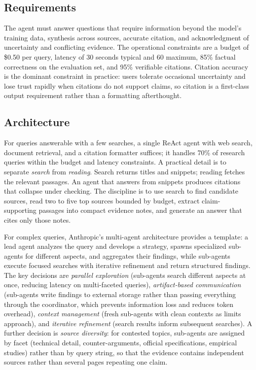 \documentclass[11pt]{book}
\begin{document}
\subsection{Requirements}

The agent must answer questions that require information beyond the model's training data, synthesis across sources, accurate citation, and acknowledgment of uncertainty and conflicting evidence. The operational constraints are a budget of \$0.50 per query, latency of 30 seconds typical and 60 maximum, 85\% factual correctness on the evaluation set, and 95\% verifiable citations. Citation accuracy is the dominant constraint in practice: users tolerate occasional uncertainty and lose trust rapidly when citations do not support claims, so citation is a first-class output requirement rather than a formatting afterthought.

\subsection{Architecture}

For queries answerable with a few searches, a single ReAct agent with web search, document retrieval, and a citation formatter suffices; it handles 70\% of research queries within the budget and latency constraints. A practical detail is to separate \textit{search} from \textit{reading}. Search returns titles and snippets; reading fetches the relevant passages. An agent that answers from snippets produces citations that collapse under checking. The discipline is to use search to find candidate sources, read two to five top sources bounded by budget, extract claim-supporting passages into compact evidence notes, and generate an answer that cites only those notes.

For complex queries, Anthropic's multi-agent architecture \cite{anthropicresearch2025} provides a template: a lead agent analyzes the query and develops a strategy, spawns specialized sub-agents for different aspects, and aggregates their findings, while sub-agents execute focused searches with iterative refinement and return structured findings. The key decisions are \textit{parallel exploration} (sub-agents search different aspects at once, reducing latency on multi-faceted queries), \textit{artifact-based communication} (sub-agents write findings to external storage rather than passing everything through the coordinator, which prevents information loss and reduces token overhead), \textit{context management} (fresh sub-agents with clean contexts as limits approach), and \textit{iterative refinement} (search results inform subsequent searches). A further decision is \textit{source diversity}: for contested topics, sub-agents are assigned by facet (technical detail, counter-arguments, official specifications, empirical studies) rather than by query string, so that the evidence contains independent sources rather than several pages repeating one claim.
\end{document}
